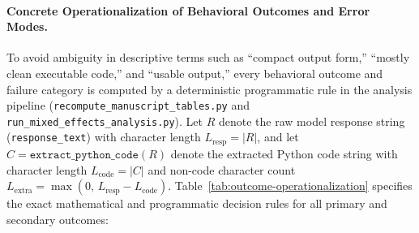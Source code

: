 \documentclass[a4paper,fleqn]{cas-sc}
\begin{document}
\paragraph{Concrete Operationalization of Behavioral Outcomes and Error Modes.}
To avoid ambiguity in descriptive terms such as ``compact output form,'' ``mostly clean executable code,'' and ``usable output,'' every behavioral outcome and failure category is computed by a deterministic programmatic rule in the analysis pipeline (\texttt{recompute\_manuscript\_tables.py} and \texttt{run\_mixed\_effects\_analysis.py}). Let $R$ denote the raw model response string (\texttt{response\_text}) with character length $L_{\text{resp}} = |R|$, and let $C = \texttt{extract\_python\_code}(R)$ denote the extracted Python code string with character length $L_{\text{code}} = |C|$ and non-code character count $L_{\text{extra}} = \max(0,\, L_{\text{resp}} - L_{\text{code}})$. Table~\ref{tab:outcome-operationalization} specifies the exact mathematical and programmatic decision rules for all primary and secondary outcomes:
\end{document}
